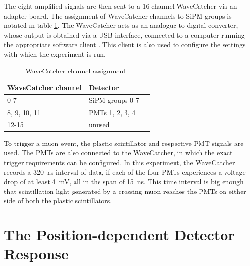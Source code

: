The eight amplified signals are then sent to a 16-channel WaveCatcher \cite{wavecatcher-manual} via an adapter board. The assignment of WaveCatcher channels to \ac{SiPM} groups is notated in table \ref{tab:channels}. The WaveCatcher acts as an analogue-to-digital converter, whose output is obtained via a USB-interface, connected to a computer running the appropriate software client \cite{wavecatcher-software}. 
This client is also used to configure the settings with which the experiment is run.

\begin{table}[h]
	\centering
	\begin{tabular}{@{}lll@{}}
		\midrule
		WaveCatcher channel  & Detector \\
		\midrule
		0-7          &   \ac{SiPM} groups 0-7 \\
		8, 9, 10, 11          &   \acsp{PMT} 1, 2, 3, 4\\
		12-15          &   unused\\
		\midrule
	\end{tabular}
	\caption{WaveCatcher channel assignment.}
	\label{tab:channels}
\end{table}

To trigger a muon event, the plastic scintillator and respective \ac{PMT} signals are used. The \acsp{PMT} are also connected to the WaveCatcher, in which the exact trigger requirements can be configured. In this experiment, the WaveCatcher records a \SI{320}{\nano\second} interval of data, if each of the four \acsp{PMT} experiences a voltage drop of at least \SI{4}{\milli\volt}, all in the span of \SI{15}{\nano\second}. This time interval is big enough that scintillation light generated by a crossing muon reaches the \acsp{PMT} on either side of both the plastic scintillators.


\section{The Position-dependent Detector Response}

